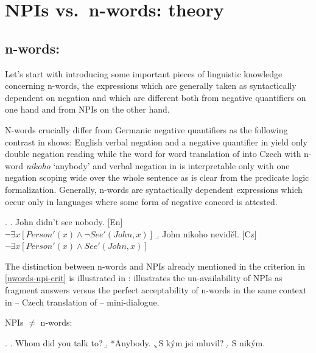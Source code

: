 \documentclass[12pt]{scrartcl}
\begin{document}
\hypertarget{npis-vs.n-words-theory}{%
\section{NPIs vs.~n-words: theory}\label{npis-vs.n-words-theory}}

\hypertarget{n-words}{%
	\subsection{n-words:}\label{n-words}}

Let's start with introducing some important pieces of linguistic knowledge concerning n-words, the expressions which are generally taken as syntactically dependent on negation and which are different both from negative quantifiers on one hand and from NPIs on the other hand.

N-words crucially differ from Germanic negative quantifiers as the following contrast in \Next shows: English verbal negation and a negative quantifier in \Next[a] yield only double negation reading while the word for word translation of \Next[a] into Czech with n-word \textit{nikoho} `anybody' and verbal negation in \Next[b] is interpretable only with one negation scoping wide over the whole sentence as is clear from the predicate logic formalization. Generally, n-words are syntactically dependent expressions which occur only in languages where some form of negative concord is attested.

\ex. \a. John didn't see nobody. \hfill [En]\\
 \(\neg \exists x[Person'(x) \wedge \neg See'(John,x)]\)
 \b. John nikoho neviděl. \hfill [Cz]\\
 \(\neg \exists x[Person'(x) \wedge See'(John,x)]\)

The distinction between n-words and NPIs already mentioned in the criterion in \ref{nwords-npi-crit} is illustrated in \Next: \Next[b] illustrates the un-availability of NPIs as fragment answers versus the perfect acceptability of n-words in the same context in \Next[d] -- Czech translation of \Next[a] -- \Next[b] mini-dialogue.

  NPIs \(\neq\) n-words:

\ex. \a. Whom did you talk to? \b. *Anybody.
\c. S kým jsi mluvil? \d. S nikým.
\end{document}
